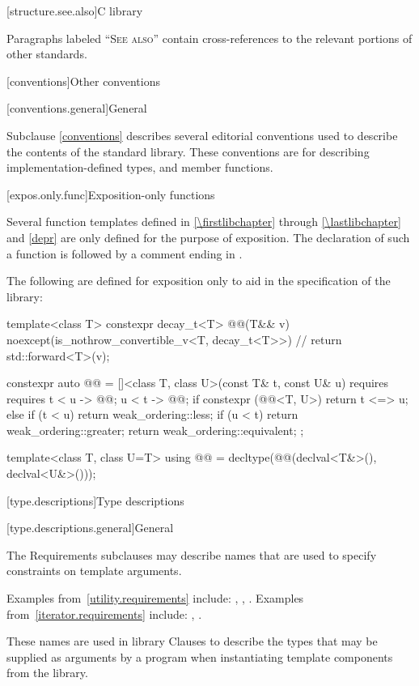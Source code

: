 [structure.see.also]{C library}

\pnum
Paragraphs labeled ``\textsc{See also}'' contain cross-references to the relevant portions
of other standards.

[conventions]{Other conventions}

[conventions.general]{General}
%

\pnum
Subclause \ref{conventions} describes several editorial conventions used to describe the contents
of the \Cpp{} standard library.
These conventions are for describing
implementation-defined types,
and member functions.

[expos.only.func]{Exposition-only functions}

\pnum
Several function templates
defined in \ref{\firstlibchapter} through \ref{\lastlibchapter} and \ref{depr}
are only defined for the purpose of exposition.
The declaration of such a function is followed by a comment ending in \expos.

\pnum
The following are defined for exposition only
to aid in the specification of the library:
%
\begin{codeblock}
template<class T> constexpr decay_t<T> @@(T&& v)
    noexcept(is_nothrow_convertible_v<T, decay_t<T>>)           // \expos
  { return std::forward<T>(v); }

constexpr auto @@ =
  []<class T, class U>(const T& t, const U& u)
    requires requires {
      { t < u } -> @@;
      { u < t } -> @@;
    }
  {
    if constexpr (@@<T, U>) {
      return t <=> u;
    } else {
      if (t < u) return weak_ordering::less;
      if (u < t) return weak_ordering::greater;
      return weak_ordering::equivalent;
    }
  };

template<class T, class U=T>
using @@ = decltype(@@(declval<T&>(), declval<U&>()));
\end{codeblock}

[type.descriptions]{Type descriptions}

[type.descriptions.general]{General}

\pnum
The Requirements subclauses may describe names that are used to specify
constraints on template arguments.
\begin{footnote}
Examples
from~\ref{utility.requirements} include:
,
,
.
Examples from~\ref{iterator.requirements} include:
,
.
\end{footnote}
These names are used in library Clauses
to describe the types that
may be supplied as arguments by a \Cpp{} program when instantiating template components from
the library.

